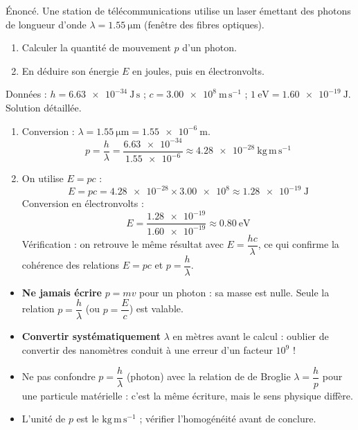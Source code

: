 \documentclass[11pt]{article}
\begin{document}
\begin{exoresolu}
Énoncé. Une station de télécommunications utilise un laser émettant des photons de longueur d'onde $\lambda = \num{1,55}\ \mathrm{\mu m}$ (fenêtre des fibres optiques).
\begin{enumerate}
\item Calculer la quantité de mouvement $p$ d'un photon.
\item En déduire son énergie $E$ en joules, puis en électronvolts.
\end{enumerate}
Données : $h = \num{6,63e-34}\ \mathrm{J\,s}$ ; $c = \num{3,00e8}\ \mathrm{m\,s^{-1}}$ ; $1\ \mathrm{eV} = \num{1,60e-19}\ \mathrm{J}$.
\tcblower
Solution détaillée.
\begin{enumerate}
\item Conversion : $\lambda = \num{1,55}\ \mathrm{\mu m} = \num{1,55e-6}\ \mathrm{m}$.
\[
p = \frac{h}{\lambda} = \frac{\num{6,63e-34}}{\num{1,55e-6}} \approx \num{4,28e-28}\ \mathrm{kg\,m\,s^{-1}}
\]
\item On utilise $E = pc$ :
\[
E = pc = \num{4,28e-28} \times \num{3,00e8} \approx \num{1,28e-19}\ \mathrm{J}
\]
Conversion en électronvolts :
\[
E = \frac{\num{1,28e-19}}{\num{1,60e-19}} \approx \num{0,80}\ \mathrm{eV}
\]
Vérification : on retrouve le même résultat avec $E = \dfrac{hc}{\lambda}$, ce qui confirme la cohérence des relations $E = pc$ et $p = \dfrac{h}{\lambda}$.
\end{enumerate}
\end{exoresolu}

\begin{attention}
\begin{itemize}
\item \textbf{Ne jamais écrire} $p = mv$ pour un photon : sa masse est nulle. Seule la relation $p = \dfrac{h}{\lambda}$ (ou $p = \dfrac{E}{c}$) est valable.
\item \textbf{Convertir systématiquement} $\lambda$ en mètres avant le calcul : oublier de convertir des nanomètres conduit à une erreur d'un facteur $10^9$ !
\item Ne pas confondre $p = \dfrac{h}{\lambda}$ (photon) avec la relation de de Broglie $\lambda = \dfrac{h}{p}$ pour une particule matérielle : c'est la même écriture, mais le sens physique diffère.
\item L'unité de $p$ est le $\mathrm{kg\,m\,s^{-1}}$ ; vérifier l'homogénéité avant de conclure.
\end{itemize}
\end{attention}
\end{document}
